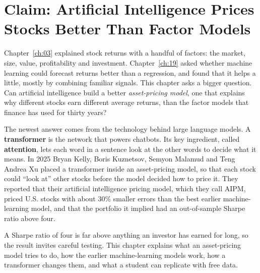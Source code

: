 \makeatletter
{}
\makeatother

\chapter{Claim: Artificial Intelligence Prices Stocks Better Than Factor Models}
\label{ch:20}

Chapter~\ref{ch:03} explained stock returns with a handful of factors: the market, size, value, profitability and investment. Chapter~\ref{ch:19} asked whether machine learning could forecast returns better than a regression, and found that it helps a little, mostly by combining familiar signals. This chapter asks a bigger question. Can artificial intelligence build a better \emph{asset-pricing model}, one that explains why different stocks earn different average returns, than the factor models that finance has used for thirty years?

The newest answer comes from the technology behind large language models. A \textbf{transformer} is the network that powers chatbots. Its key ingredient, called \textbf{attention}, lets each word in a sentence look at the other words to decide what it means. In 2025 Bryan Kelly, Boris Kuznetsov, Semyon Malamud and Teng Andrea Xu placed a transformer inside an asset-pricing model, so that each stock could ``look at'' other stocks before the model decided how to price it. They reported that their artificial intelligence pricing model, which they call AIPM, priced U.S. stocks with about 30\% smaller errors than the best earlier machine-learning model, and that the portfolio it implied had an out-of-sample Sharpe ratio above four.

A Sharpe ratio of four is far above anything an investor has earned for long, so the result invites careful testing. This chapter explains what an asset-pricing model tries to do, how the earlier machine-learning models work, how a transformer changes them, and what a student can replicate with free data.

